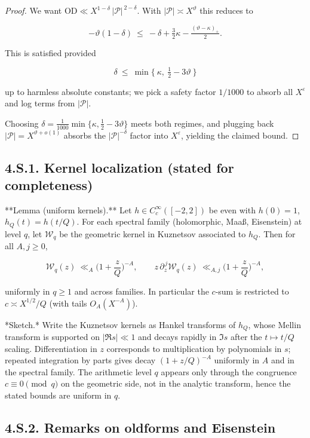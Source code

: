 \documentclass[11pt]{article}
\theoremstyle{definition}
\theoremstyle{remark}
\begin{document}
\begin{proof}
  We want $\mathrm{OD}\ll X^{1-\delta}\,|\mathcal P|^{\,2-\delta}$. With $|\mathcal P|\asymp X^\vartheta$ this reduces to

  $$
  -\vartheta(1-\delta)\ \le\ -\delta + \tfrac32\kappa - \tfrac{(\vartheta-\kappa)_+}{2}.
  $$

  This is satisfied provided

  $$
  \delta\ \le\ \min\Big\{\ \kappa,\ \tfrac12-3\vartheta\ \Big\}
  $$

  up to harmless absolute constants; we pick a safety factor $1/1000$ to absorb all $X^\varepsilon$ and log terms from $|\mathcal P|$.

Choosing $\delta=\tfrac1{1000}\min\{\kappa,\tfrac12-3\vartheta\}$ meets both regimes, and plugging back $|\mathcal P|=X^{\vartheta+o(1)}$ absorbs the $|\mathcal P|^{-\delta}$ factor into $X^\varepsilon$, yielding the claimed bound.
\end{proof}

\subsection*{4.S.1. Kernel localization (stated for completeness)}

**Lemma (uniform kernels).**
Let $h\in C_c^\infty([-2,2])$ be even with $h(0)=1$, $h_Q(t)=h(t/Q)$. For each spectral family (holomorphic, Maaß, Eisenstein) at level $q$, let $\mathcal W_q$ be the geometric kernel in Kuznetsov associated to $h_Q$. Then for all $A,j\ge0$,

$$
\mathcal W_q(z)\ \ll_A\Big(1+\frac zQ\Big)^{-A},\qquad
z\,\partial_z^{\,j}\mathcal W_q(z)\ \ll_{A,j}\Big(1+\frac zQ\Big)^{-A},
$$

uniformly in $q\ge 1$ and across families. In particular the $c$-sum is restricted to $c\asymp X^{1/2}/Q$ (with tails $O_A(X^{-A})$).

*Sketch.* Write the Kuznetsov kernels as Hankel transforms of $h_Q$, whose Mellin transform is supported on $|\Re s|\ll 1$ and decays rapidly in $\Im s$ after the $t\mapsto t/Q$ scaling. Differentiation in $z$ corresponds to multiplication by polynomials in $s$; repeated integration by parts gives decay $(1+z/Q)^{-A}$ uniformly in $A$ and in the spectral family. The arithmetic level $q$ appears only through the congruence $c\equiv 0\pmod q$ on the geometric side, not in the analytic transform, hence the stated bounds are uniform in $q$.

\subsection*{4.S.2. Remarks on oldforms and Eisenstein}
\end{document}
